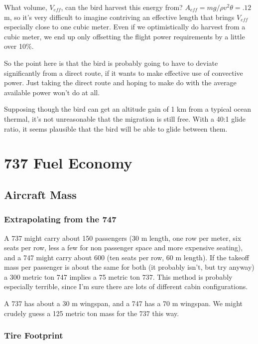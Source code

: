 \documentclass[12pt]{article}
\begin{document}
What volume, \(V_{eff}\), can the bird harvest this energy from? \(A_{eff} = mg/\rho v^2 \theta = .12\) m, so it's very difficult to imagine contriving an effective length that brings \(V_{eff}\) especially close to one cubic meter. Even if we optimistically do harvest from a cubic meter, we end up only offsetting the flight power requirements by a little over 10\%. 

So the point here is that the bird is probably going to have to deviate significantly from a direct route, if it wants to make effective use of convective power. Just taking the direct route and hoping to make do with the average available power won't do at all.

Supposing though the bird can get an altitude gain of 1 km from a typical ocean thermal, it's not unreasonable that the migration is still free. With a 40:1 glide ratio, it seems plausible that the bird will be able to glide between them.


\section{737 Fuel Economy}

\subsection{Aircraft Mass}

\subsubsection{Extrapolating from the 747}

A 737 might carry about 150 passengers (30 m length, one row per meter, six seats per row, less a few for non passenger space and more expensive seating), and a 747 might carry about 600 (ten seats per row, 60 m length). If the takeoff mass per passenger is about the same for both (it probably isn't, but try anyway) a 300 metric ton 747 implies a 75 metric ton 737. This method is probably especially terrible, since I'm sure there are lots of different cabin configurations.

A 737 has about a 30 m wingspan, and a 747 has a 70 m wingspan. We might crudely guess a 125 metric ton mass for the 737 this way.


\subsubsection{Tire Footprint}
\end{document}
